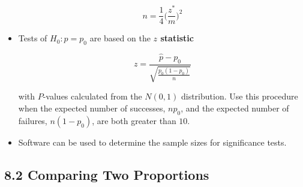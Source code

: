 \begin{itemize}
			\[n=\frac{1}{4} \bigg(\frac{z^{*}}{m}\bigg)^2\]
			
			\item Tests of $H_0: p = p_0$ are based on the \textbf{$z$ statistic}
			
			\[z=\frac{\hat{p}-p_0}{\sqrt{\frac{p_0(1-p_0)}{n}}}\]
			
			with $P$-values calculated from the $N(0, 1)$ distribution. Use this procedure when the expected number of successes, $np_0$, and the expected number of failures, $n(1 - p_0)$, are both greater than $10$.
			
			\item Software can be used to determine the sample sizes for significance tests.
		\end{itemize}
	\subsection{8.2 Comparing Two Proportions}
